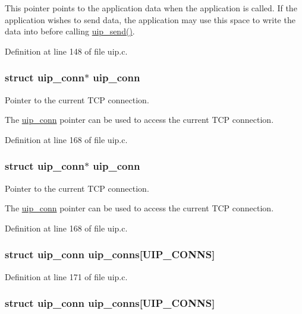 This pointer points to the application data when the application is called. If the application wishes to send data, the application may use this space to write the data into before calling \hyperlink{group__uip_ga04b053a623aac7cd4195157d470661b3}{uip\_\-send()}. 

Definition at line 148 of file uip.c.

\hypertarget{group__uip_ga788ffac72342f6172343d7f8099cbe1a}{
\subsubsection[{uip\_\-conn}]{\setlength{\rightskip}{0pt plus 5cm}struct {\bf uip\_\-conn}$\ast$ {\bf uip\_\-conn}}}
\label{group__uip_ga788ffac72342f6172343d7f8099cbe1a}
Pointer to the current TCP connection.

The \hyperlink{structuip__conn}{uip\_\-conn} pointer can be used to access the current TCP connection. 

Definition at line 168 of file uip.c.

\hypertarget{group__uip_ga788ffac72342f6172343d7f8099cbe1a}{
\subsubsection[{uip\_\-conn}]{\setlength{\rightskip}{0pt plus 5cm}struct {\bf uip\_\-conn}$\ast$ {\bf uip\_\-conn}}}
\label{group__uip_ga788ffac72342f6172343d7f8099cbe1a}
Pointer to the current TCP connection.

The \hyperlink{structuip__conn}{uip\_\-conn} pointer can be used to access the current TCP connection. 

Definition at line 168 of file uip.c.

\hypertarget{group__uip_gaf703683056d2bfa5c81fa157dcb20fe2}{
\subsubsection[{uip\_\-conns}]{\setlength{\rightskip}{0pt plus 5cm}struct {\bf uip\_\-conn} {\bf uip\_\-conns}\mbox{[}UIP\_\-CONNS\mbox{]}}}
\label{group__uip_gaf703683056d2bfa5c81fa157dcb20fe2}


Definition at line 171 of file uip.c.

\hypertarget{group__uip_gaf703683056d2bfa5c81fa157dcb20fe2}{
\subsubsection[{uip\_\-conns}]{\setlength{\rightskip}{0pt plus 5cm}struct {\bf uip\_\-conn} {\bf uip\_\-conns}\mbox{[}UIP\_\-CONNS\mbox{]}}}
\label{group__uip_gaf703683056d2bfa5c81fa157dcb20fe2}


